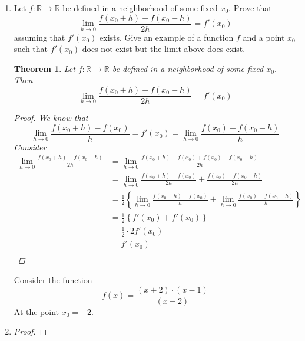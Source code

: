 \documentclass{amsart}
\newtheorem{theorem}{Theorem}
\begin{document}
\begin{enumerate}[1.]
    \newpage
    \item  Let $f: \mathbb{R} \to \mathbb{R}$ be defined in a neighborhood of some fixed $x_0$. Prove that 
    \[ \lim_{h \to 0} \frac{f(x_0+h) - f(x_0-h)}{2h} = f'(x_0) \]
    assuming that $f'(x_0)$ exists. Give an example of a function $f$ and a point $x_0$ such that $f'(x_0)$ does not exist but the limit above does exist.
    \begin{theorem}
        Let $f: \mathbb{R} \to \mathbb{R}$ be defined in a neighborhood of some fixed $x_0$. Then 
    \[ \lim_{h \to 0} \frac{f(x_0+h) - f(x_0-h)}{2h} = f'(x_0) \]
    \begin{proof}
        We know that 
        \[
            \lim_{h \to 0} \frac{f(x_0 + h) - f(x_0)}{h} = f'(x_0) =  \lim_{h \to 0} \frac{f(x_0) - f(x_0 - h)}{h}  
        \]
        Consider
        \begin{align*}
            \lim_{h \to 0} \frac{f(x_0 + h) - f(x_0 - h)}{2h} &=  \lim_{h \to 0} \frac{f(x_0 + h) - f(x_0) + f(x_0) - f(x_0 - h)}{2h} \\
            &=  \lim_{h \to 0} \frac{f(x_0 + h) - f(x_0)}{2h} + \frac{f(x_0) - f(x_0 -h)}{2h} \\
            &= \frac{1}{2} \left\{ \lim_{h \to 0} \frac{f(x_0 + h) - f(x_0)}{h} + \lim_{h \to 0} \frac{f(x_0) - f(x_0 -h)}{h}\right\} \\
            &= \frac{1}{2} \left\{ f'(x_0) + f'(x_0) \right\} \\
            &= \frac{1}{2} \cdot 2f'(x_0) \\
            &= f'(x_0) \\
        \end{align*}
    \end{proof}
    \end{theorem}

    Consider the function
    \[
        f(x) = \frac{(x + 2)\cdot (x - 1)}{(x + 2)}    
    \]
    At the point $x_0 = -2$.
    \newpage
    \item  
    \begin{proof}
        
    \end{proof}
    \end{enumerate}
    
\end{document}
